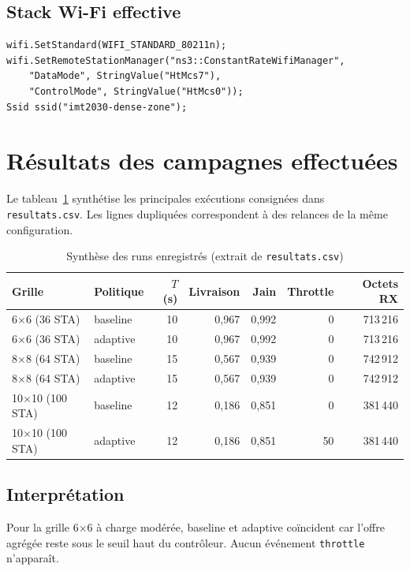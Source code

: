 \documentclass[11pt,a4paper]{article}
\begin{document}
\subsection{Stack Wi-Fi effective}

\begin{lstlisting}
wifi.SetStandard(WIFI_STANDARD_80211n);
wifi.SetRemoteStationManager("ns3::ConstantRateWifiManager",
    "DataMode", StringValue("HtMcs7"),
    "ControlMode", StringValue("HtMcs0"));
Ssid ssid("imt2030-dense-zone");
\end{lstlisting}

\section{Résultats des campagnes effectuées}

Le tableau~\ref{tab:resultats} synthétise les principales exécutions consignées dans \texttt{resultats.csv}. Les lignes dupliquées correspondent à des relances de la même configuration.

\begin{table}[H]
  \centering
  \caption{Synthèse des runs enregistrés (extrait de \texttt{resultats.csv})}
  \label{tab:resultats}
  \small
  \begin{tabular}{@{}llrrrrr@{}}
    \toprule
    Grille & Politique & $T$ (s) & Livraison & Jain & Throttle & Octets RX \\
    \midrule
    6$\times$6 (36 STA) & baseline & 10 & 0,967 & 0,992 & 0 & 713\,216 \\
    6$\times$6 (36 STA) & adaptive & 10 & 0,967 & 0,992 & 0 & 713\,216 \\
    8$\times$8 (64 STA) & baseline & 15 & 0,567 & 0,939 & 0 & 742\,912 \\
    8$\times$8 (64 STA) & adaptive & 15 & 0,567 & 0,939 & 0 & 742\,912 \\
    10$\times$10 (100 STA) & baseline & 12 & 0,186 & 0,851 & 0 & 381\,440 \\
    10$\times$10 (100 STA) & adaptive & 12 & 0,186 & 0,851 & 50 & 381\,440 \\
    \bottomrule
  \end{tabular}
\end{table}

\subsection{Interprétation}

Pour la grille 6$\times$6 à charge modérée, baseline et adaptive coïncident car l'offre agrégée reste sous le seuil haut du contrôleur. Aucun événement \texttt{throttle} n'apparaît.
\end{document}

